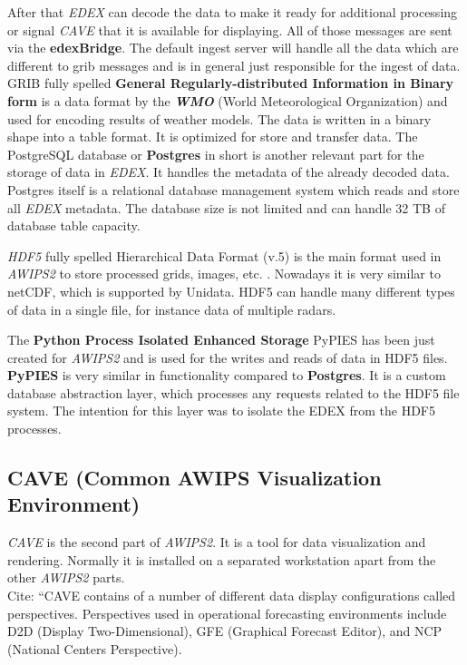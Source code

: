 \documentclass[]{article}
\begin{document}
After that \emph{EDEX} can decode the data to make it ready for
additional processing or signal \emph{CAVE} that it is available for
displaying. All of those messages are sent via the \textbf{edexBridge}.
The default ingest server will handle all the data which are different
to grib messages and is in general just responsible for the ingest of
data. GRIB fully spelled \textbf{General Regularly-distributed
Information in Binary form} is a data format by the \textbf{\emph{WMO}}
(World Meteorological Organization) and used for encoding results of
weather models. The data is written in a binary shape into a table
format. It is optimized for store and transfer data. The PostgreSQL
database or \textbf{Postgres} in short is another relevant part for the
storage of data in \emph{EDEX}. It handles the metadata of the already
decoded data. Postgres itself is a relational database management system
which reads and store all \emph{EDEX} metadata. The database size is not
limited and can handle 32 TB of database table capacity.

\emph{HDF5} fully spelled Hierarchical Data Format (v.5) is the main
format used in \emph{AWIPS2} to store processed grids, images, etc. .
Nowadays it is very similar to netCDF, which is supported by Unidata.
HDF5 can handle many different types of data in a single file, for
instance data of multiple radars.

The \textbf{Python Process Isolated Enhanced Storage} PyPIES has been
just created for \emph{AWIPS2} and is used for the writes and reads of
data in HDF5 files. \textbf{PyPIES} is very similar in functionality
compared to \textbf{Postgres}. It is a custom database abstraction
layer, which processes any requests related to the HDF5 file system. The
intention for this layer was to isolate the EDEX from the HDF5
processes.

\subsection{CAVE (Common AWIPS Visualization
Environment)}\label{cave-common-awips-visualization-environment}

\emph{CAVE} is the second part of \emph{AWIPS2}. It is a tool for data
visualization and rendering. Normally it is installed on a separated
workstation apart from the other \emph{AWIPS2} parts.\\
Cite: ``CAVE contains of a number of different data display
configurations called perspectives. Perspectives used in operational
forecasting environments include D2D (Display Two-Dimensional), GFE
(Graphical Forecast Editor), and NCP (National Centers Perspective).
\cite{AwipsDocs}
\end{document}

